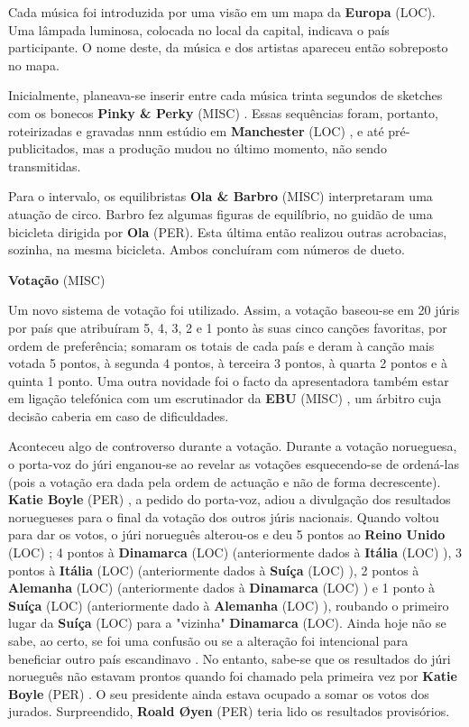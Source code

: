 \documentclass[12pt,a4paper]{article}
\begin{document}
Cada música foi introduzida por uma visão em um mapa da \textbf{Europa} (LOC). Uma lâmpada luminosa, colocada no local da capital, indicava o país participante. O nome deste, da música e dos artistas apareceu então sobreposto no mapa.

Inicialmente, planeava-se inserir entre cada música trinta segundos de sketches com os bonecos \textbf{Pinky \& Perky} (MISC) . Essas sequências foram, portanto, roteirizadas e gravadas nnm estúdio em \textbf{Manchester} (LOC) , e até pré-publicitados, mas a produção mudou no último momento, não sendo transmitidas.

Para o intervalo, os equilibristas \textbf{Ola \& Barbro} (MISC) interpretaram uma atuação de circo. Barbro fez algumas figuras de equilíbrio, no guidão de uma bicicleta dirigida por \textbf{Ola} (PER). Esta última então realizou outras acrobacias, sozinha, na mesma bicicleta. Ambos concluíram com números de dueto.



\textbf{Votação} (MISC)

Um novo sistema de votação foi utilizado. Assim, a votação baseou-se em 20 júris por país que atribuíram 5, 4, 3, 2 e 1 ponto às suas cinco canções favoritas, por ordem de preferência; somaram os totais de cada país e deram à canção mais votada 5 pontos, à segunda 4 pontos, à terceira 3 pontos, à quarta 2 pontos e à quinta 1 ponto. Uma outra novidade foi o facto da apresentadora também estar em ligação telefónica com um escrutinador da \textbf{EBU} (MISC) , um árbitro cuja decisão caberia em caso de dificuldades.

Aconteceu algo de controverso durante a votação. Durante a votação norueguesa, o porta-voz do júri enganou-se ao revelar as votações esquecendo-se de ordená-las (pois a votação era dada pela ordem de actuação e não de forma decrescente). \textbf{Katie Boyle} (PER) , a pedido do porta-voz, adiou a divulgação dos resultados noruegueses para o final da votação dos outros júris nacionais. Quando voltou para dar os votos, o júri norueguês alterou-os e deu 5 pontos ao \textbf{Reino Unido} (LOC) ; 4 pontos à \textbf{Dinamarca} (LOC) (anteriormente dados à \textbf{Itália} (LOC) ), 3 pontos à \textbf{Itália} (LOC) (anteriormente dados à \textbf{Suíça} (LOC) ), 2 pontos à \textbf{Alemanha} (LOC) (anteriormente dados à \textbf{Dinamarca} (LOC) ) e 1 ponto à \textbf{Suíça} (LOC) (anteriormente dado à \textbf{Alemanha} (LOC) ), roubando o primeiro lugar da \textbf{Suíça} (LOC) para a "vizinha" \textbf{Dinamarca} (LOC). Ainda hoje não se sabe, ao certo, se foi uma confusão ou se a alteração foi intencional para beneficiar outro país escandinavo . No entanto, sabe-se que os resultados do júri norueguês não estavam prontos quando foi chamado pela primeira vez por \textbf{Katie Boyle} (PER) . O seu presidente ainda estava ocupado a somar os votos dos jurados. Surpreendido, \textbf{Roald Øyen} (PER) teria lido os resultados provisórios.
\end{document}
